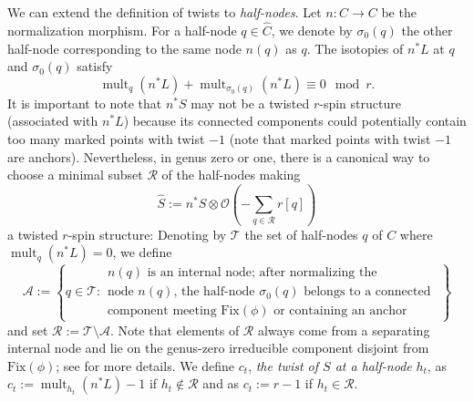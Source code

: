 \documentclass[11pt]{amsart}
\theoremstyle{definition}
\theoremstyle{remark}
\newcommand{\<}{\left<}
\renewcommand{\>}{\right>}
\numberwithin{equation}{section}
\begin{document}
We can extend the definition of twists to \textit{half-nodes}. Let $n: \widehat{C} \to C$ be the normalization morphism. For a half-node $q\in \widehat{C}$, we denote by $\sigma_0(q)$ the other half-node corresponding to the same node $n(q)$ as $q$. The isotopies of $n^*L$ at $q$ and $\sigma_0(q)$ satisfy $$\operatorname{mult}_{q}(n^*L)+\operatorname{mult}_{\sigma_0(q)}(n^*L)\equiv0 \mod r.$$ It is important to note that $n^*S$ may not be a twisted $r$-spin structure (associated with %
$n^*L$) because %
its connected components could potentially contain too many marked points with twist $-1$ (note that marked points with twist $-1$ are anchors).  Nevertheless, in genus zero or one, there is a canonical way to choose a minimal subset $\mathcal{R}$ of the half-nodes making
\begin{equation}
\label{eq normalize S}
\widehat{S}:= n^* S \otimes {\mathcal{O}}\left(-\sum_{q \in \mathcal{R}} r [q]\right)
\end{equation}
a twisted $r$-spin %
structure: Denoting by %
$\mathcal T$ the set of half-nodes $q$ of $C$ where $\operatorname{mult}_{q}(n^*L)=0$, we %
define
\begin{equation*}
\mathcal A:= \left\{q \in \mathcal T\colon 
\begin{array}{ccc}
    \text{$n(q)$ is an internal node; after normalizing the }\\
    \text{node $n(q)$, the half-node $\sigma_0(q)$ belongs to a connected }\\
    \text{component meeting $\text{Fix}(\phi)$ or containing an anchor}
\end{array} \right\}
\end{equation*}
and %
set $\mathcal R := \mathcal T \setminus \mathcal A$. Note that elements of $\mathcal R$ always come from a separating internal node and lie on the genus-zero irreducible component disjoint %
from $\text{Fix}(\phi)$; see %
\cite[\S 2.3]{BCT1} for more details. 
We define $c_t$, \textit{the twist of $S$ at a half-node} $h_t$, as $c_t:=\operatorname{mult}_{h_t}(n^*L)-1$ if $h_t \notin \mathcal R$ and as $c_t:=r-1$ if $h_t\in \mathcal R$.
\end{document}
